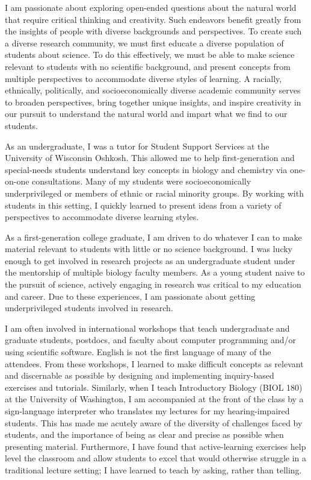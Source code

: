 I am passionate about exploring open-ended questions about the natural world
that require critical thinking and creativity.
Such endeavors benefit greatly from the insights of people with diverse
backgrounds and perspectives.
To create such a diverse research community, we must first educate a diverse
population of students about science.
To do this effectively, we must be able to make science relevant to students
with no scientific background, and present concepts from multiple perspectives
to accommodate diverse styles of learning.
A racially, ethnically, politically, and socioeconomically diverse academic
community serves to broaden perspectives, bring together unique insights, and
inspire creativity in our pursuit to understand the natural world and impart
what we find to our students.

As an undergraduate, I was a tutor for Student Support Services at the
University of Wisconsin Oshkosh.
This allowed me to help first-generation and special-needs students understand
key concepts in biology and chemistry via one-on-one consultations.
Many of my students were socioeconomically underprivileged or members of ethnic
or racial minority groups.
By working with students in this setting, I quickly learned to present ideas
from a variety of perspectives to accommodate diverse learning styles.

As a first-generation college graduate, I am driven to do whatever I can to
make material relevant to students with little or no science background.
I was lucky enough to get involved in research projects as an undergraduate
student under the mentorship of multiple biology faculty members.
As a young student naive to the pursuit of science, actively engaging in
research was critical to my education and career.
Due to these experiences, I am passionate about getting underprivileged
students involved in research.

I am often involved in international workshops that teach undergraduate and
graduate students, postdocs, and faculty about computer programming and/or
using scientific software.
English is not the first language of many of the attendees.
From these workshops, I learned to make difficult concepts as relevant and
discernable as possible by designing and implementing inquiry-based exercises
and tutorials.
Similarly, when I teach Introductory Biology (BIOL 180) at the University of
Washington, I am accompanied at the front of the class by a sign-language
interpreter who translates my lectures for my hearing-impaired students.
This has made me acutely aware of the diversity of challenges faced by
students, and the importance of being as clear and precise as possible when
presenting material.
Furthermore, I have found that active-learning exercises help level the
classroom and allow students to excel that would otherwise struggle in a
traditional lecture setting; I have learned to teach by asking, rather than
telling.

